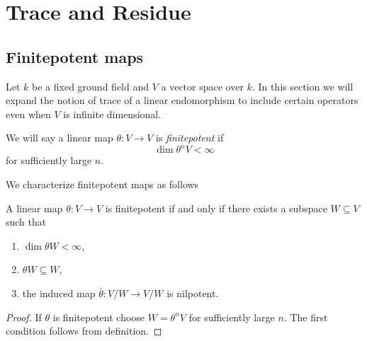 \chapter{Trace and Residue}\label{ch:trace-and-residue}
\section{Finitepotent maps}
Let $k$ be a fixed ground field and $V$ a vector space over $k$. In this section we will expand the notion of trace of a linear endomorphism to include certain operators even when $V$ is infinite dimensional.
\begin{definition}\label{finitepotent}
	We will say a linear map $\theta\colon V \to V$ is \textit{finitepotent} if
	\[
		\dim \theta^{n}V < \infty
	\]
	for sufficiently large $n$.
\end{definition}
We characterize finitepotent maps as follows
\begin{proposition}\label{characterization-of-finitepotent-maps}
	A linear map $\theta\colon V \to V$ is finitepotent if and only if there exists a subspace $W \subseteq V$ such that
	\begin{enumerate}[label = (\roman*)]
		\item $\dim \theta W < \infty$,
		\item $\theta W \subseteq W$,
		\item the induced map $\bar{\theta}\colon V/W \to V/W$ is nilpotent.
	\end{enumerate}
\end{proposition}
\begin{proof}
	If $\theta$ is finitepotent choose $W = \theta^{n}V$ for sufficiently large $n$. The first condition follows from definition. 
\end{proof}


